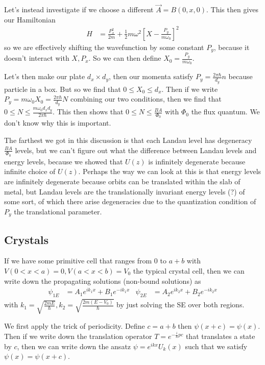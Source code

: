 \documentclass[12pt]{article}
\begin{document}
Let's instead investigate if we choose a different $\vec{A} = B(0,x,0)$. This then gives our Hamiltonian
\begin{align}
    H &= \frac{P_x^2}{2m} + \frac{1}{2}m\omega^2\left[ X - \frac{P_y}{m\omega_0} \right]^2
\end{align}
so we are effectively shifting the wavefunction by some constant $P_y$, because it doesn't interact with $X, P_x$. So we can then define $X_0 = \frac{P_y}{m\omega_0}$. 

Let's then make our plate $d_x \times d_y$, then our momenta satisfy $P_y = \frac{2\pi \hbar}{d_y}n$ because particle in a box. But so we find that $0 \leq X_0 \leq d_x$. Then if we write $P_y = m\omega_0X_0 = \frac{2\pi \hbar}{d_y}N$ combining our two conditions, then we find that $0 \leq N \leq \frac{m\omega_0 d_x d_y}{2\pi \hbar}$. This then shows that $0 \leq N \leq \frac{BA}{\Phi_0}$ with $\Phi_0$ the flux quantum. We don't know why this is important. 

The farthest we got in this discussion is that each Landau level has degeneracy $\frac{BA}{\Phi_0}$ levels, but we can't figure out what the difference between Landau levels and energy levels, because we showed that $U(z)$ is infinitely degenerate because infinite choice of $U(z)$. Perhaps the way we can look at this is that energy levels are infinitely degenerate because orbits can be translated within the slab of metal, but Landau levels are the translationally invariant energy levels (?) of some sort, of which there arise degeneracies due to the quantization condition of $P_y$ the translational parameter. 

\subsection{Crystals}

If we have some primitive cell that ranges from $0$ to $a+b$ with $V(0 < x < a) = 0, V(a < x < b) = V_0$ the typical crystal cell, then we can write down the propagating solutions (non-bound solutions) as
\begin{align}
    \psi_{1E} &= A_1e^{ik_1x} + B_1e^{-ik_1x} & \psi_{2E} &= A_2e^{ik_2x} + B_2e^{-ik_2x}\label{propsols}
\end{align}
with $k_1 = \sqrt{\frac{2mE}{\hbar}}, k_2 = \sqrt{\frac{2m(E-V_0)}{\hbar}}$ by just solving the SE over both regions.

We first apply the trick of periodicity. Define $c = a+b$ then $\psi(x+c) = \psi(x)$. Then if we write down the translation operator $T = e^{-\frac{i}{\hbar}pc}$ that translates a state by $c$, then we can write down the ansatz $\psi = e^{ikx}U_k(x)$ such that we satisfy $\psi(x) = \psi(x+c)$. 
\end{document}
